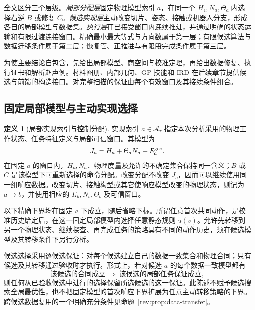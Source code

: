 \documentclass[11pt,a4paper]{article}
\numberwithin{equation}{section}
\theoremstyle{definition}
\newtheorem{definition}[theorem]{定义}
\begin{document}
全文区分三个层级。\emph{局部分配层}固定物理模型索引 $a$，在同一个 $H_a,N_a,\Theta_a$ 内选择右逆 $B$ 或修复 $C$。\emph{候选实现层}主动改变切片、姿态、接触或机器人分支，形成各自的局部模型与数据集。\emph{执行层}在已接受窗口内连续推进，并通过明确的状态运输和有限过渡连接窗口。精确最小最大等式与方向数属于第一层；有限候选算法与数据迁移条件属于第二层；恢复管、正推进与有限段完成条件属于第三层。

为使主要结论自包含，先给出局部模型、商空间与校准定理，再给出数据修复、执行证书和解析超声例。材料图册、内部几何、GP 技能和 IRD 在后续章节提供候选与前馈的构造接口。对完整扫描的保证由每个有效窗口及其接续条件组合。

\subsection{固定局部模型与主动实现选择}
\label{rev:sec:scope}

\begin{definition}[局部实现索引与控制分配]
\label{rev:def:realization-levels}
实现索引 $a\in\mathcal A_\tau$ 指定本次分析采用的物理工作状态、任务特征定义与局部可信窗口。其模型为
\begin{equation}
 J_a=H_a+\Theta_aN_a+E_a^{\rm geo}.
 \label{rev:eq:indexed-model}
\end{equation}
在固定 $a$ 的窗口内，$H_a,N_a$、物理度量及允许的不确定集合保持同一含义；$B$ 或 $C$ 是该模型下可重新选择的命令分配。改变分配不改变 $J_a$，因而可以继续使用同一组响应数据。改变切片、接触构型或其它使响应模型改变的物理状态，则记为 $a\to b$，并使用相应的 $H_b,N_b,\Theta_b$ 及可信窗口。
\end{definition}

以下精确下界均在固定 $a$ 下成立，随后省略下标。所谓任意首次共同动作，是校准历史给定后，在这一固定局部模型内选择任意静态规则 $u(v)$。允许先转移到另一个物理状态、继续探查、再完成任务的策略具有不同的动作历史，须在候选模型及其转移条件下另行分析。

候选选择采用逐候选保证：对每个候选建立自己的数据一致集合和物理合同；只有候选及其转移通过验收时才执行。形式上，若对候选 $a$ 的每个数据一致模型都有
\begin{equation}
 \text{该候选的合同成立}
 \ \Longrightarrow\
 \text{该候选的局部任务保证成立},
 \label{rev:eq:per-candidate-quantifier}
\end{equation}
则任何从已验收候选中进行的选择保留所选候选的这一保证。此陈述不赋予候选搜索全局最优性，也不把固定模型的首次响应下界扩展为任意主动转移策略的下界。跨候选数据复用的一个明确充分条件见命题~\ref{rev:prop:data-transfer}。
\end{document}
